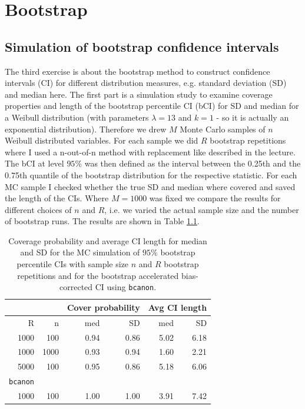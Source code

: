 \chapter{Bootstrap}

\section{Simulation of bootstrap confidence intervals}
The third exercise is about the bootstrap method to construct confidence intervals (CI) for different distribution measures, e.g. standard deviation (SD) and median here. The first part is a simulation study to examine coverage properties and length of the bootstrap percentile CI (bCI) for SD and median for a Weibull distribution (with parameters $\lambda = 13$ and $k=1$ - so it is actually an exponential distribution). Therefore we drew $M$ Monte Carlo samples of $n$ Weibull distributed variables. For each sample we did $R$ bootstrap repetitions where I used a n-out-of-n method with replacement like described in the lecture. The bCI at level $95\%$ was then defined as the interval between the 0.25th and the 0.75th quantile of the bootstrap distribution for the respective statistic. For each MC sample I checked whether the true SD and median where covered and saved the length of the CIs. Where $M=1000$ was fixed we compare the results for different choices of $n$ and $R$, i.e. we varied the actual sample size and the number of bootstrap runs. The results are shown in Table \ref{3table}. 
\begin{table}[hb]
\centering
\begin{tabular}{rrrrrr}
  \hline  
  && \multicolumn{2}{r}{Cover probability} &  \multicolumn{2}{r}{Avg CI length} \\  
  \hline
 R & n & \hspace{0.5cm}med &\hspace{0.5cm} SD &\hspace{0.5cm} med &\hspace{0.5cm} SD \\ 
  \hline
 1000 & 100 & 0.94 & 0.86 & 5.02 & 6.18 \\ 
 1000 & 1000 & 0.93 & 0.94 & 1.60 & 2.21 \\ 
 5000 & 100 & 0.95 & 0.86 & 5.18 & 6.06 \\ 
   \hline
 \texttt{bcanon}&&&&&\\
 \hline
 1000 & 100&1.00&1.00 & 3.91 & 7.42\\
 \hline
\end{tabular}
\caption{Coverage probability and average CI length for median and SD for the MC simulation of $95\%$ bootstrap percentile CIs with sample size $n$ and $R$ bootstrap repetitions and for the bootstrap accelerated bias-corrected CI using \texttt{bcanon}.}
\label{3table}
\end{table}
